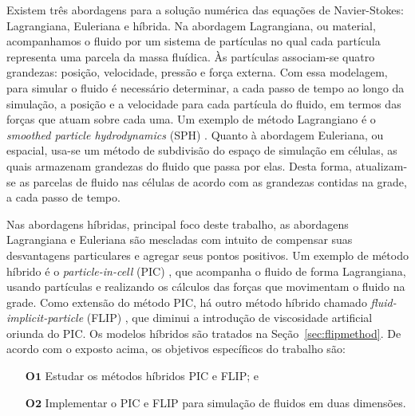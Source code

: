 \documentclass[12pt,a4paper,dvipsnames]{article}
\newcommand{\tb}[1]{\ensuremath{\textbf{#1}}}
\newcommand{\secref}[1]{Seção~\ref{#1}}
\begin{document}
Existem três abordagens para a solução numérica das equações de Navier-Stokes: Lagrangiana, Euleriana e híbrida. Na abordagem Lagrangiana, ou material, acompanhamos o fluido por um sistema de partículas no qual cada partícula representa uma parcela da massa fluídica. Às partículas associam-se quatro grandezas: posição, velocidade, pressão e força externa. Com essa modelagem, para simular o fluido é necessário determinar, a cada passo de tempo ao longo da simulação, a posição e a velocidade para cada partícula do fluido, em termos das forças que atuam sobre cada uma. Um exemplo de método Lagrangiano é o \textit{smoothed particle hydrodynamics} (SPH) \cite{SPH, egst.20141034}. Quanto à abordagem Euleriana, ou espacial, usa-se um método de subdivisão do espaço de simulação em células, as quais armazenam grandezas do fluido que passa por elas. Desta forma, atualizam-se as parcelas de fluido nas células de acordo com as grandezas contidas na grade, a cada passo de tempo.

Nas abordagens híbridas, principal foco deste trabalho, as abordagens Lagrangiana e Euleriana são mescladas com intuito de compensar suas desvantagens particulares e agregar seus pontos positivos. Um exemplo de método híbrido é o \textit{particle-in-cell} (PIC) \cite{PIC}, que acompanha o fluido de forma Lagrangiana, usando partículas e realizando os cálculos das forças que movimentam o fluido na grade. Como extensão do método PIC, há outro método híbrido chamado \textit{fluid-implicit-particle} (FLIP) \cite{FLIP, NarrowBandFlip, extendedNarrowBandFlip}, que diminui a introdução de viscosidade artificial oriunda do PIC. Os modelos híbridos são tratados na \secref{sec:flipmethod}. De acordo com o exposto acima, os objetivos específicos do trabalho são:
\begin{itemize}
\item[\tb{O1}] Estudar os métodos híbridos PIC e FLIP; e

\item[\tb{O2}] Implementar o PIC e FLIP para simulação de fluidos em duas dimensões.

\end{itemize}
\end{document}
